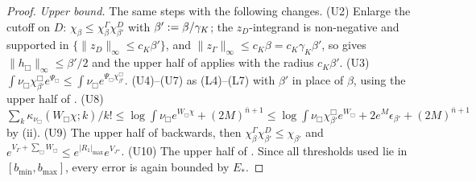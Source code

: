 \begin{proof}
\emph{Upper bound.} The same steps with the following changes. (U2) Enlarge the cutoff on $D$: $\chi_\beta\le\chi^\Gamma_\beta\chi^D_{\beta'}$ with $\beta':=\beta/\gamma_K$; the $z_D$-integrand is non-negative and supported in $\{\|z_D\|_\infty\le c_K\beta'\}$, and $\|z_\Gamma\|_\infty\le c_K\beta=c_K\gamma_K\beta'$, so  gives $\|h_\Box\|_\infty\le\beta'/2$ and the upper half of  applies with the radius $c_K\beta'$. (U3) $\int\nu_\Box\chi^\Box_{\beta'}e^{\Psi_\Box}\le\int\nu_\Box e^{\Psi_\Box\chi^\Box_{\beta'}}$. (U4)--(U7) as (L4)--(L7) with $\beta'$ in place of $\beta$, using the upper half of . (U8) $\sum_k\kappa_{\nu_\Box}(W_\Box\chi;k)/k!\le\log\int\nu_\Box e^{W_\Box\chi}+(2M)^{\bar n+1}\le\log\int\nu_\Box\chi^\Box_{\beta'}e^{W_\Box}+2e^{M}\epsilon_{\beta'}+(2M)^{\bar n+1}$ by (ii). (U9) The upper half of  backwards, then $\chi^\Gamma_\beta\chi^D_{\beta'}\le\chi_{\beta'}$ and $e^{V_\Gamma+\sum_\Box W_\Box}\le e^{|R_1|_{\max}}e^{V_{J''}}$. (U10) The upper half of . Since all thresholds used lie in $[b_{\min},b_{\max}]$, every error is again bounded by $E_*$.
\end{proof}

